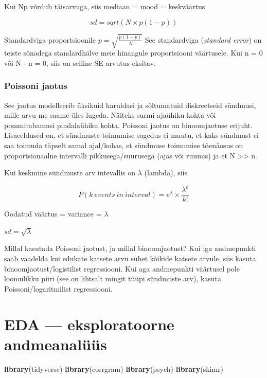\documentclass[]{book}
\newenvironment{Shaded}{\begin{snugshade}}{\end{snugshade}}
\newcommand{\KeywordTok}[1]{\textcolor[rgb]{0.13,0.29,0.53}{\textbf{#1}}}
\newcommand{\NormalTok}[1]{#1}
\begin{document}
Kui Np võrdub täisarvuga, siis mediaan = mood = keskväärtus

\[sd = sqrt(N \times p(1 - p))\]

Standardviga proportsioonile \(p = \sqrt{\frac{p(1 - p)}{N}}\) See
standardviga (\emph{standard error}) on teiste sõnadega standardhälve
meie hinangule proportsiooni väärtusele. Kui n = 0 või N - n = 0, siis
on selline SE arvutus eksitav.

\subsection{Poissoni jaotus}\label{poissoni-jaotus}

See jaotus modelleerib üksikuid haruldasi ja sõltumatuid diskreetseid
sündmusi, mille arvu me saame üles lugeda. Näiteks surmi ajaühiku kohta
või pommitabamusi pindalaühiku kohta. Poissoni jaotus on binoomjaotuse
erijuht. Lisaeeldused on, et sündmuste toimumise sagedus ei muutu, et
kaks sündmust ei saa toimuda täpselt samal ajal/kohas, et sündmuse
toimumise tõenäosus on proportsionaalne intervalli pikkusega/suurusega
(ajas või ruumis) ja et N \textgreater{}\textgreater{} n.

Kui keskmine sündmuste arv intevallis on \(\lambda\) (lambda), siis

\[P(k~events~in~interval) = e^{\lambda} \times \frac{\lambda ^{k}}{k!}\]

Oodatud väärtus = variance = \(\lambda\)

\(sd = \sqrt{\lambda}\)

Millal kasutada Poissoni jaotust, ja millal binoomjaotust? Kui iga
andmepunkti saab vaadelda kui edukate katsete arvu suhet kõikide katsete
arvule, siis kasuta binoomjaotust/logistilist regressiooni. Kui aga
andmepunkti väärtusel pole loomulikku piiri (see on lihtsalt mingit
tüüpi sündmuste arv), kasuta Poissoni/logaritmilist regressiooni.

\chapter{EDA --- eksploratoorne
andmeanalüüs}\label{eda-eksploratoorne-andmeanaluus}

\begin{Shaded}
\begin{Highlighting}[]
\KeywordTok{library}\NormalTok{(tidyverse)}
\KeywordTok{library}\NormalTok{(corrgram)}
\KeywordTok{library}\NormalTok{(psych)}
\KeywordTok{library}\NormalTok{(skimr)}
\end{Highlighting}
\end{Shaded}
\end{document}
